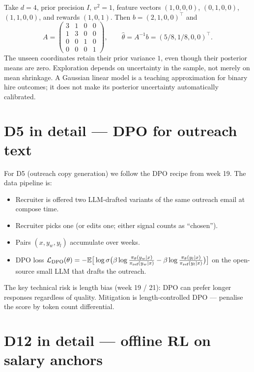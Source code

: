 \documentclass[11pt,oneside]{scrbook}
\begin{document}
\begin{example}
Take $d=4$, prior precision $I$, $v^2=1$, feature vectors
$(1,0,0,0)$, $(0,1,0,0)$, $(1,1,0,0)$, and rewards $(1,0,1)$.
Then $b=(2,1,0,0)^\top$ and
\[
 A=\begin{pmatrix}3&1&0&0\\1&3&0&0\\0&0&1&0\\0&0&0&1\end{pmatrix},
 \qquad \hat\theta=A^{-1}b=(5/8,1/8,0,0)^\top.
\]
The unseen coordinates retain their prior variance $1$, even though their
posterior means are zero. Exploration depends on uncertainty in the sample,
not merely on mean shrinkage. A Gaussian linear model is a teaching
approximation for binary hire outcomes; it does not make its posterior
uncertainty automatically calibrated.
\end{example}

\section{D5 in detail --- DPO for outreach text}

For D5 (outreach copy generation) we follow the DPO recipe from week 19.
The data pipeline is:

\begin{itemize}
  \item Recruiter is offered two LLM-drafted variants of the same
        outreach email at compose time.
  \item Recruiter picks one (or edits one; either signal counts as
        ``chosen'').
  \item Pairs $(x, y_w, y_l)$ accumulate over weeks.
  \item DPO loss
        $\mathcal{L}_{\text{DPO}}(\theta) =
          -\mathbb{E}\big[\log \sigma\big( \beta \log \tfrac{\pi_\theta(y_w|x)}{\pi_{\text{ref}}(y_w|x)}
                                   - \beta \log \tfrac{\pi_\theta(y_l|x)}{\pi_{\text{ref}}(y_l|x)} \big)\big]$
        on the open-source small LLM that drafts the outreach.
\end{itemize}

The key technical risk is length bias (week 19 / 21): DPO can prefer
longer responses regardless of quality. Mitigation is length-controlled
DPO --- penalise the score by token count differential.

\section{D12 in detail --- offline RL on salary anchors}
\end{document}
